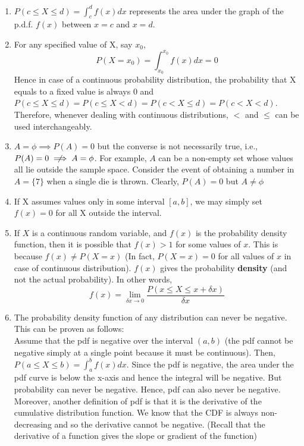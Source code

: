 \begin{note}
\end{note}
\begin{enumerate}
    \item $P(c \leq X \leq d) = \int_{c}^{d} f(x) dx $ represents the area under the graph of the p.d.f. $f(x)$ between $x = c$ and $x = d$.
    \item For any specified value of X, say $x_0$, 
    $$
    P(X = x_0) = \int_{x_0}^{x_0} f(x)dx = 0
    $$
    Hence in case of a continuous probability distribution, the probability that X equals to a fixed value is always 0 and $P(c \leq X \leq d) = P(c \leq X < d) = P(c < X \leq d) = P(c < X < d)$. Therefore, whenever dealing with continuous distributions, $<$ and $\leq$ can be used interchangeably.
    \item  $A = \phi \implies P(A) = 0$ but the converse is not necessarily true, i.e., $P(A) = 0 \centernot\implies A = \phi$. For example, $A$ can be a non-empty set whose values all lie outside the sample space. Consider the event of obtaining a number in $A = \{7\}$ when a single die is thrown. Clearly, $P(A) = 0$ but $A \neq \phi$
    \item If X assumes values only in some interval $[a,b]$, we may simply set $f(x) = 0$ for all X outside the interval.
    \item If $X$ is a continuous random variable, and $f(x)$ is the probability density function, then it is possible that $f(x) > 1$ for some values of $x$. This is because $f(x) \neq P(X = x)$ (In fact, $P(X = x) = 0$ for all values of $x$ in case of continuous distribution). $f(x)$ gives the probability \textbf{density} (and not the actual probability). In other words,
    $$
    f(x) = \lim_{\delta x \xrightarrow{} 0} \dfrac{P(x \leq X \leq x + \delta x)}{\delta x}
    $$
    \item The probability density function of any distribution can never be negative. This can be proven as follows: \\ Assume that the pdf is negative over the interval $(a,b)$ (the pdf cannot be negative simply at a single point because it must be continuous). Then, $P(a \leq X \leq b) = \int_{a}^{b} f(x) dx$. Since the pdf is negative, the area under the pdf curve is below the x-axis and hence the integral will be negative. But probability can never be negative. Hence, pdf can also never be negative. \\ Moreover, another definition of pdf is that it is the derivative of the cumulative distribution function. We know that the CDF is always non-decreasing and so the derivative cannot be negative. (Recall that the derivative of a function gives the slope or gradient of the function)
\end{enumerate}


